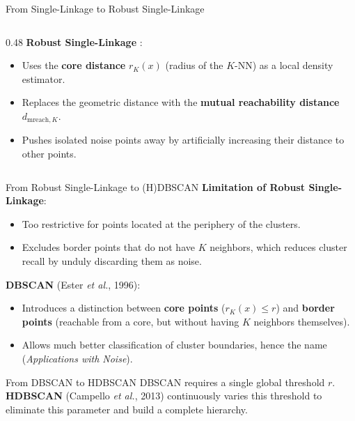 \documentclass[A4,svgnames,9pt,aspectratio=169]{beamer}
\begin{document}
\begin{frame}{From Single-Linkage to Robust Single-Linkage}
\begin{columns}[c, onlytextwidth]
\begin{column}{0.48\textwidth}
            \vspace{0.4cm}
            \textbf{Robust Single-Linkage} \cite{RobustSingleLinkage2010}:
            \begin{itemize}
                \setlength{\itemsep}{6pt}
                \item Uses the \textbf{core distance} $r_K(x)$ (radius of the $K$-NN) as a local density estimator.
                \item Replaces the geometric distance with the \textbf{mutual reachability distance} $d_{\mathrm{mreach}, K}$.
                \item Pushes isolated noise points away by artificially increasing their distance to other points.
            \end{itemize}
        \end{column}
    \end{columns}
\end{frame}

\begin{frame}{From Robust Single-Linkage to (H)DBSCAN}
    \textbf{Limitation of Robust Single-Linkage}:
    \begin{itemize}
        \setlength{\itemsep}{6pt}
        \item Too restrictive for points located at the periphery of the clusters.
        \item Excludes border points that do not have $K$ neighbors, which reduces cluster recall by unduly discarding them as noise.
    \end{itemize}
    
    \vspace{0.4cm}
    \textbf{DBSCAN} \cite{DBSCAN} (Ester \emph{et al.}, 1996):
    \begin{itemize}
        \setlength{\itemsep}{6pt}
        \item Introduces a distinction between \textbf{core points} ($r_K(x) \le r$) and \textbf{border points} (reachable from a core, but without having $K$ neighbors themselves).
        \item Allows much better classification of cluster boundaries, hence the name (\emph{Applications with Noise}).
    \end{itemize}
    
    \vspace{0.4cm}
    \begin{block}{From DBSCAN to HDBSCAN}
        DBSCAN requires a single global threshold $r$. 
        \textbf{HDBSCAN} \cite{HDBSCAN} (Campello \emph{et al.}, 2013) continuously varies this threshold to eliminate this parameter and build a complete hierarchy.
    \end{block}
\end{frame}
\end{document}
